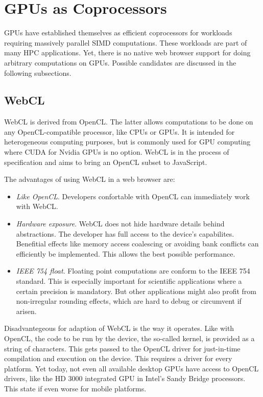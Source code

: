 \section{GPUs as Coprocessors} \label{chapter_webgpu}

GPUs have established themselves as efficient coprocessors for workloads requiring massively parallel SIMD computations. These workloads are part of many HPC applications. Yet, there is no native web browser support for doing arbitrary computations on GPUs. Possible candidates are discussed in the following subsections.


\subsection{WebCL}

WebCL is derived from OpenCL. The latter allows computations to be done on any OpenCL-compatible processor, like CPUs or GPUs. It is intended for heterogeneous computing purposes, but is commonly used for GPU computing where CUDA for Nvidia GPUs is no option.  WebCL is in the process of specification and aims to bring an OpenCL subset to JavaScript.

The advantages of using WebCL in a web browser are:

\begin{itemize}

\item \textit{Like OpenCL}. Developers confortable with OpenCL can immediately work with WebCL.

\item \textit{Hardware exposure}. WebCL does not hide hardware details behind abstractions. The developer has full access to the device's capabilites. Benefitial effects like memory access coalescing or avoiding bank conflicts can efficiently be implemented. This allows the best possible performance.

\item \textit{IEEE 754 float}. Floating point computations are conform to the IEEE 754 standard. This is especially important for scientific applications where a certain precision is mandatory. But other applications might also profit from non-irregular rounding effects, which are hard to debug or circumvent if arisen.

\end{itemize}

Disadvantegeous for adaption of WebCL is the way it operates. Like with OpenCL, the code to be run by the device, the so-called kernel, is provided as a string of characters. This gets passed to the OpenCL driver for just-in-time compilation and execution on the device. This requires a driver for every platform. Yet today, not even all available desktop GPUs have access to OpenCL drivers, like the HD 3000 integrated GPU in Intel's Sandy Bridge processors. This state if even worse for mobile platforms.

